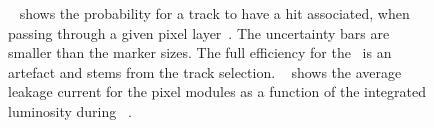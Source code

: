 \begin{figure}[tbp!]
\centering
{}
\hfill
\caption[Performance of the pixel detector during \RunOne]{
%
\Fig~ shows the probability for a track to have a hit associated, when passing through a given pixel layer~\cite{Pernegger:1985432}. The uncertainty bars are smaller than the marker sizes. The full efficiency for the \blayer\ is an artefact and stems from the track selection.
% 
\Fig~ shows the average leakage current for the pixel modules as a function of the integrated luminosity during \RunOne~\cite{LaRosa:1956433}.
%
}
\end{figure}






